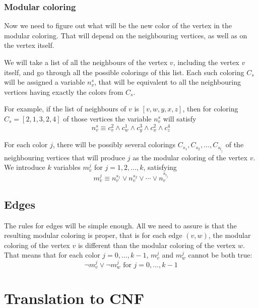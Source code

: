 \documentclass[letterpaper]{article}
\let\vel\vee
\let\at\wedge
\begin{document}
\subsubsection{Modular coloring}

Now we need to figure out what will be the new color of the vertex in the
modular coloring.  That will depend on the neighbouring vertices, as well as on
the vertex itself.

We will take a list of all the neighbours of the vertex $v$, including the
vertex $v$ itself, and go through all
the possible colorings of this list.  Each such coloring $C_s$ will be assigned
a variable $n_v^s$, that will be equivalent to all the neighbouring vertices
having exactly the colors from $C_s$. 

For example, if the list of neighbours of $v$ is $[v,w,y,x,z]$, then for coloring
$C_s = [2,1,3,2,4]$ of those vertices the variable $n_v^s$ will satisfy
\begin{equation}
 n_v^s \equiv c_v^2 \at c_w^1 \at c_y^3 \at c_x^2 \at c_z^4
   \label{eq:neighbours}
\end{equation}

For each color $j$, there will be possibly several colorings $C_{s_1}, C_{s_2},
\dots, C_{s_{t_j}}$ of the neighbouring vertices that will produce $j$ as the
modular coloring of the vertex $v$.  We introduce $k$ variables $m_v^j$ for $j
= 1, 2, \dots, k$, satisfying
\begin{equation}
   m_v^j \equiv n_v^{s_1} \vel n_v^{s_2} \vel \cdots \vel n_v^{s_{t_j}}
   \label{eq:modular}
\end{equation}

\subsection{Edges}

The rules for edges will be simple enough.  All we need to assure is that the
resulting modular coloring is proper, that is for each edge $(v,w)$, the
modular coloring of the vertex $v$ is different than the modular coloring of
the vertex $w$.   That means that for each color $j = 0,\dots,k-1$, $m_v^j$ and
$m_w^j$ cannot be both true:
\begin{equation}
   \neg m_v^j \vel \neg m_w^j \text{ for $j = 0,\dots,k-1$}
   \label{eq:edge}
\end{equation}

\section{Translation to CNF}
\end{document}

